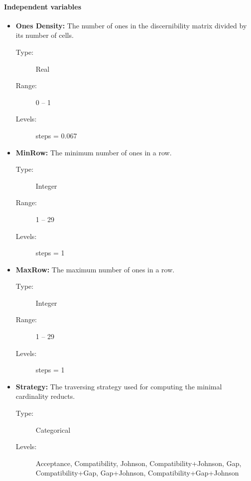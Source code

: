 \documentclass[11pt]{article}   %
\begin{document}
  \paragraph{Independent variables}  
  	\begin{itemize}
  	   \item \textbf{Ones Density:} The number of ones in the discernibility matrix divided by its number of
  	   								 cells.
  	   		\begin{description}
  	   			\item[Type:] Real
  	   			\item[Range:] 0 -- 1
  	   			\item[Levels:] steps = 0.067
  	   		\end{description}
  	   \item \textbf{MinRow:} The minimum number of ones in a row.
  	   		\begin{description}
  	   			\item[Type:] Integer
  	   			\item[Range:] 1 -- 29
  	   			\item[Levels:] steps = 1
  	   		\end{description}
  	   \item \textbf{MaxRow:} The maximum number of ones in a row.
  	   		\begin{description}
  	   			\item[Type:] Integer
  	   			\item[Range:] 1 -- 29
  	   			\item[Levels:] steps = 1
  	   		\end{description}
  	   \item \textbf{Strategy:} The traversing strategy used for computing the minimal cardinality reducts.
  	   		\begin{description}
  	   			\item[Type:] Categorical
  	   			\item[Levels:] Acceptance, Compatibility, Johnson, Compatibility+Johnson, Gap, Compatibility+Gap,
  	   						   Gap+Johnson, Compatibility+Gap+Johnson
  	   		\end{description}
    \end{itemize}	
\end{document}
